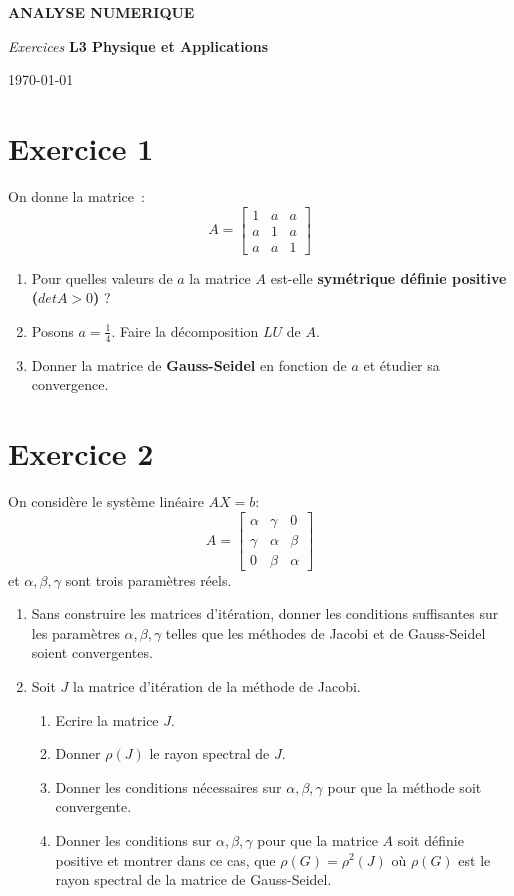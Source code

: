 \documentclass[11pt,a4paper,french]{article}
\def\be{\begin{enumerate}}
\def\ee{\end{enumerate}}
\def\ea{\end{array}}
\def\bc{\begin{center}}
\def\ec{\end{center}}
\begin{document}
\bc
{\large \bf ANALYSE NUMERIQUE}

{\large \it Exercices}
\vskip 10mm
{\bf L3 Physique et Applications }

\today
\ec

\section*{Exercice 1}
On donne la matrice~:
$$
A = \left[ \begin{array}{ccc} 	1 & a & a \\
			a & 1 & a \\
			a & a & 1
\end{array} \right]
$$

\be
\item Pour quelles valeurs de $a$ la matrice $A$ est-elle {\bf sym\'etrique d\'efinie positive ($det A > 0$)} ?
\item Posons $a=\frac{1}{4}$. Faire la d\'ecomposition $LU$ de $A$.
\item Donner la matrice de {\bf Gauss-Seidel} en fonction de $a$ et \'etudier sa convergence.
\ee

\section*{Exercice 2}
On consid\`ere le syst\`eme lin\'eaire $AX=b$:
$$
A = \left[ \begin{array}{ccc} 	\alpha & \gamma & 0 \\
			\gamma & \alpha & \beta \\
			0 & \beta & \alpha
\ea \right]
$$
et $\alpha, \beta, \gamma$ sont trois param\`etres r\'eels.
\be
\item Sans construire les matrices d'it\'eration, donner les conditions suffisantes sur les param\`etres $\alpha, \beta, \gamma$ telles que les m\'ethodes de Jacobi et de Gauss-Seidel soient convergentes.
\item Soit $J$ la matrice d'it\'eration de la m\'ethode de Jacobi.
\be
\item Ecrire la matrice $J$.
\item Donner $\rho(J)$ le rayon spectral de $J$.
\item Donner les conditions n\'ecessaires sur $\alpha, \beta, \gamma$ pour que la m\'ethode soit convergente.
\item Donner les conditions sur $\alpha, \beta, \gamma$ pour que la matrice $A$ soit d\'efinie positive et montrer dans ce cas, que $\rho(G) = \rho^2(J) $ o\`u $\rho(G)$ est le rayon spectral de la matrice de Gauss-Seidel.
\ee
\ee
\end{document}
